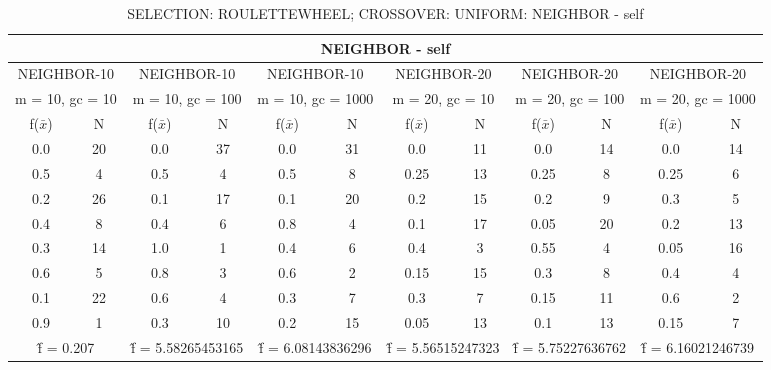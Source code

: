 \begin{table}[H]
	\centering
	\caption{SELECTION: ROULETTEWHEEL; CROSSOVER: UNIFORM: NEIGHBOR - self}
	\begin{adjustbox}{width=1\textwidth}
		\begin{tabular}{ |c|c||c|c||c|c||c|c||c|c||c|c| }
			\hline
			\multicolumn{12}{|c|}{NEIGHBOR - self} \\
			\hline
			\multicolumn{2}{|c||}{NEIGHBOR-10} & \multicolumn{2}{c||}{NEIGHBOR-10} & \multicolumn{2}{c||}{NEIGHBOR-10} & \multicolumn{2}{c||}{NEIGHBOR-20} & \multicolumn{2}{c||}{NEIGHBOR-20} & \multicolumn{2}{c|}{NEIGHBOR-20}\\
			\hline
			\multicolumn{2}{|c||}{m = 10, gc = 10} & \multicolumn{2}{c||}{m = 10, gc = 100} & \multicolumn{2}{c||}{m = 10, gc = 1000} & \multicolumn{2}{c||}{m = 20, gc = 10} & \multicolumn{2}{c||}{m = 20, gc = 100} & \multicolumn{2}{c|}{m = 20, gc = 1000}\\
			\hline
			f($\bar{x}$) & N & f($\bar{x}$) & N & f($\bar{x}$) & N & f($\bar{x}$) & N & f($\bar{x}$) & N & f($\bar{x}$) & N\\
			\hline
			\hline
			0.0 & 20 & 0.0 & 37 & 0.0 & 31 & 0.0 & 11 & 0.0 & 14 & 0.0 & 14\\
			0.5 & 4 & 0.5 & 4 & 0.5 & 8 & 0.25 & 13 & 0.25 & 8 & 0.25 & 6\\
			0.2 & 26 & 0.1 & 17 & 0.1 & 20 & 0.2 & 15 & 0.2 & 9 & 0.3 & 5\\
			0.4 & 8 & 0.4 & 6 & 0.8 & 4 & 0.1 & 17 & 0.05 & 20 & 0.2 & 13\\
			0.3 & 14 & 1.0 & 1 & 0.4 & 6 & 0.4 & 3 & 0.55 & 4 & 0.05 & 16\\
			0.6 & 5 & 0.8 & 3 & 0.6 & 2 & 0.15 & 15 & 0.3 & 8 & 0.4 & 4\\
			0.1 & 22 & 0.6 & 4 & 0.3 & 7 & 0.3 & 7 & 0.15 & 11 & 0.6 & 2\\
			0.9 & 1 & 0.3 & 10 & 0.2 & 15 & 0.05 & 13 & 0.1 & 13 & 0.15 & 7\\
			\hline
			\multicolumn{2}{|c||}{\^{f} = 0.207} & \multicolumn{2}{c||}{\^{f} = 5.58265453165} & \multicolumn{2}{c||}{\^{f} = 6.08143836296} & \multicolumn{2}{c||}{\^{f} = 5.56515247323} & \multicolumn{2}{c||}{\^{f} = 5.75227636762} & \multicolumn{2}{c|}{\^{f} = 6.16021246739}\\
			\hline
		\end{tabular}
	\end{adjustbox}
\end{table}
